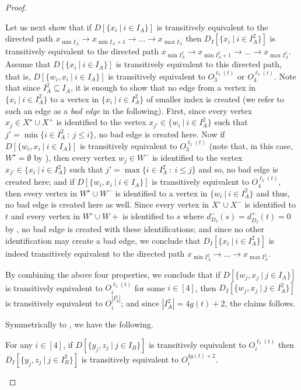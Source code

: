 \begin{proof}
\begin{claimproof}
Let us next show that if $D[\{x_i~|~i \in I_A\}]$ is transitively equivalent to the directed path 
$x_{\min I_A} \rightarrow x_{\min I_A +1} \rightarrow \ldots \rightarrow x_{\max I_A}$ then
$D_I[\{x_i~|~i \in I_A^2\}]$ is transitively equivalent to the directed path 
$x_{\min I_A^2} \rightarrow x_{\min I_A^2 +1} \rightarrow \ldots \rightarrow x_{\max I_A^2}$.
Assume that $D[\{x_i~|~i \in I_A\}]$ is transitively equivalent to this directed path, that is,
$D[\{w_i,x_i~|~i \in I_A\}]$ is transitively equivalent to $O_3^{\ell_5(t)}$ or $O_4^{\ell_5(t)}$.
Note that since $I_A^2 \subseteq I_A$, it is enough to show that no edge from a vertex in $\{x_i~|~i \in I_A^2\}$ to a vertex in $\{x_i~|~i \in I_A^2\}$ of smaller index is created (we refer to such an edge as a \emph{bad edge} in the following).
First, since every vertex $x_j \in X^\star \cup X^+$ is identified to the vertex $x_{j'} \in \{w_i~|~i \in I_A^2\}$ such that $j' = \min \{i \in I_A^2~:~ j \leq i\}$, no bad edge is created here. 
Now if $D[\{w_i,x_i~|~i \in I_A\}]$ is transitively equivalent to $O_3^{\ell_5(t)}$ (note that, in this case, $W^\star = \emptyset$ by ), then every vertex $w_j \in W^-$ is identified to the vertex $x_{j'} \in \{x_i~|~i \in I_A^2\}$ such that $j' = \max \{i \in I_A^2~:~i \leq j\}$ and so, no bad edge is created here; and if $D[\{w_i,x_i~|~i \in I_A\}]$ is transitively equivalent to $O_4^{\ell_5(t)}$, then every vertex in $W^\star \cup W^-$ is identified to a vertex in $\{w_i~|~i \in I_A^2\}$ and thus, no bad edge is created here as well. 
Since every vertex in $X^\circ \cup X^-$ is identified to $t$ and every vertex in $W^\circ \cup W+$ is identified to $s$ where $d^-_{D_I}(s) = d^+_{D_I}(t) = 0$ by , no bad edge is created with these identifications;
and since no other identification may create a bad edge, we conclude that $D_I[\{x_i~|~i \in I_A^2\}]$ is indeed transitively equivalent to the directed path $x_{\min I_A^2} \rightarrow \ldots \rightarrow x_{\max I_A^2}$.

By combining the above four properties, we conclude that if $D[\{w_j,x_j~|~j\in I_A\}]$ is transitively equivalent to $O_i^{\ell_5(t)}$ for some $i \in [4]$, then
$D_I[\{w_j,x_j~|~j \in I_A^2\}]$ is transitively equivalent to $O_i^{|I_A^2|}$; and since $|I_A^2| = 4g(t) + 2$, the claims follows.
\end{claimproof}

Symmetrically to , we have the following.

\begin{claim}
\label{clm:sameinDIYZ}
For any $i \in [4]$, if $D[\{y_j,z_j~|~j\in I_B\}]$ is transitively equivalent to $O_i^{\ell_5(t)}$ then
$D_I[\{y_j,z_j~|~j \in I_B^2\}]$ is transitively equivalent to $O_i^{4g(t)+2}$.
\end{claim}


\end{proof}

